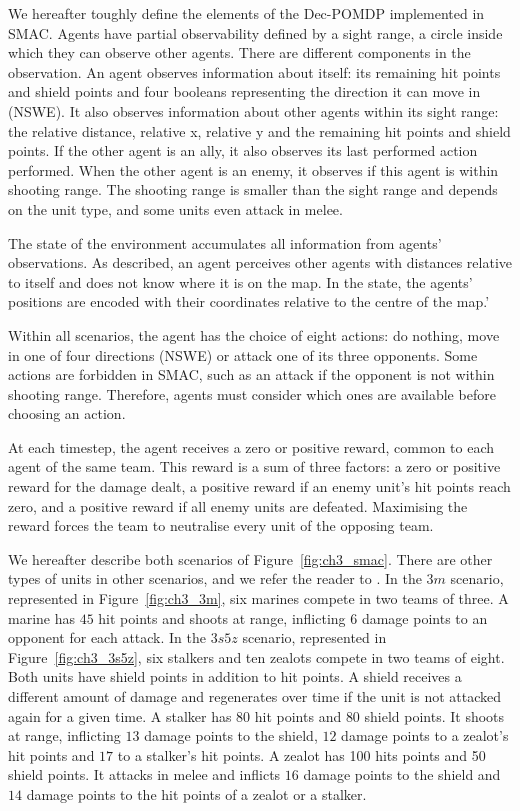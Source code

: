 We hereafter toughly define the elements of the Dec-POMDP implemented in SMAC.
Agents have partial observability defined by a sight range, a circle inside which they can observe other agents.
There are different components in the observation.
An agent observes information about itself: its remaining hit points and shield points and four booleans representing the direction it can move in (NSWE). 
It also observes information about other agents within its sight range: the relative distance, relative x, relative y and the remaining hit points and shield points. 
If the other agent is an ally, it also observes its last performed action performed.
When the other agent is an enemy, it observes if this agent is within shooting range.
The shooting range is smaller than the sight range and depends on the unit type, and some units even attack in melee.

The state of the environment accumulates all information from agents' observations.
As described, an agent perceives other agents with distances relative to itself and does not know where it is on the map.
In the state, the agents' positions are encoded with their coordinates relative to the centre of the map.'

Within all scenarios, the agent has the choice of eight actions: do nothing, move in one of four directions (NSWE) or attack one of its three opponents.
Some actions are forbidden in SMAC, such as an attack if the opponent is not within shooting range.
Therefore, agents must consider which ones are available before choosing an action.

At each timestep, the agent receives a zero or positive reward, common to each agent of the same team. 
This reward is a sum of three factors: a zero or positive reward for the damage dealt, a positive reward if an enemy unit's hit points reach zero, and a positive reward if all enemy units are defeated. 
Maximising the reward forces the team to neutralise every unit of the opposing team.

We hereafter describe both scenarios of Figure~\ref{fig:ch3_smac}.
There are other types of units in other scenarios, and we refer the reader to \citep{samvelyan2019starcraft}.
In the $3m$ scenario, represented in Figure~\ref{fig:ch3_3m}, six marines compete in two teams of three.
A marine has $45$ hit points and shoots at range, inflicting $6$ damage points to an opponent for each attack.
In the $3s5z$ scenario, represented in Figure~\ref{fig:ch3_3s5z}, six stalkers and ten zealots compete in two teams of eight.
Both units have shield points in addition to hit points.
A shield receives a different amount of damage and regenerates over time if the unit is not attacked again for a given time.
A stalker has $80$ hit points and $80$ shield points.
It shoots at range, inflicting $13$ damage points to the shield, $12$ damage points to a zealot's hit points and $17$ to a stalker's hit points.
A zealot has 100 hits points and 50 shield points.
It attacks in melee and inflicts $16$ damage points to the shield and $14$ damage points to the hit points of a zealot or a stalker.

